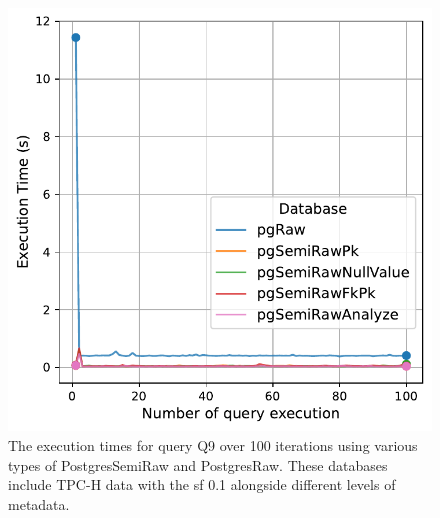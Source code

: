 \begin{figure}[hbt!]
\centering
\includegraphics[width=1.0\linewidth]{charts-eval-exp-time/execution_time_db_type_Q9.pdf}
\caption[Q9:result]{The execution times for query Q9 over 100 iterations using various types of PostgresSemiRaw and PostgresRaw. These databases include TPC-H data with the \acrshort{sf} 0.1 alongside different levels of metadata.}
\label{fig:execution_time_db_type_Q9}
\end{figure}
